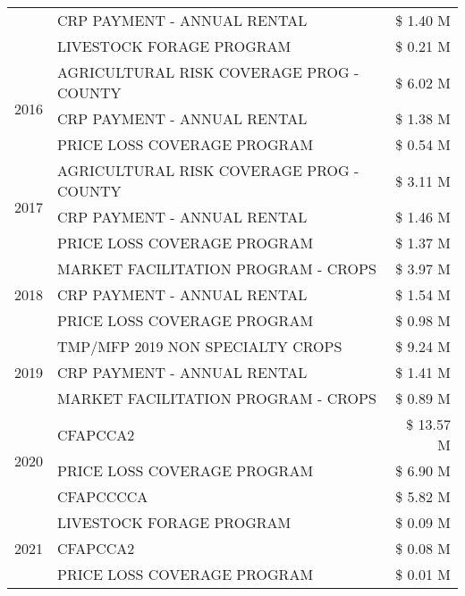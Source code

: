 \begin{tabular}{llr}
 & CRP PAYMENT - ANNUAL RENTAL & \$ 1.40 M \\
 & LIVESTOCK FORAGE PROGRAM & \$ 0.21 M \\
\cline{1-3}
\multirow[t]{3}{*}{2016} & AGRICULTURAL RISK COVERAGE PROG - COUNTY & \$ 6.02 M \\
 & CRP PAYMENT - ANNUAL RENTAL & \$ 1.38 M \\
 & PRICE LOSS COVERAGE PROGRAM & \$ 0.54 M \\
\cline{1-3}
\multirow[t]{3}{*}{2017} & AGRICULTURAL RISK COVERAGE PROG - COUNTY & \$ 3.11 M \\
 & CRP PAYMENT - ANNUAL RENTAL & \$ 1.46 M \\
 & PRICE LOSS COVERAGE PROGRAM & \$ 1.37 M \\
\cline{1-3}
\multirow[t]{3}{*}{2018} & MARKET FACILITATION PROGRAM - CROPS & \$ 3.97 M \\
 & CRP PAYMENT - ANNUAL RENTAL & \$ 1.54 M \\
 & PRICE LOSS COVERAGE PROGRAM & \$ 0.98 M \\
\cline{1-3}
\multirow[t]{3}{*}{2019} & TMP/MFP 2019 NON SPECIALTY CROPS & \$ 9.24 M \\
 & CRP PAYMENT - ANNUAL RENTAL & \$ 1.41 M \\
 & MARKET FACILITATION PROGRAM - CROPS & \$ 0.89 M \\
\cline{1-3}
\multirow[t]{3}{*}{2020} & CFAPCCA2 & \$ 13.57 M \\
 & PRICE LOSS COVERAGE PROGRAM & \$ 6.90 M \\
 & CFAPCCCCA & \$ 5.82 M \\
\cline{1-3}
\multirow[t]{3}{*}{2021} & LIVESTOCK FORAGE PROGRAM & \$ 0.09 M \\
 & CFAPCCA2 & \$ 0.08 M \\
 & PRICE LOSS COVERAGE PROGRAM & \$ 0.01 M \\
\cline{1-3}
\bottomrule
\end{tabular}
